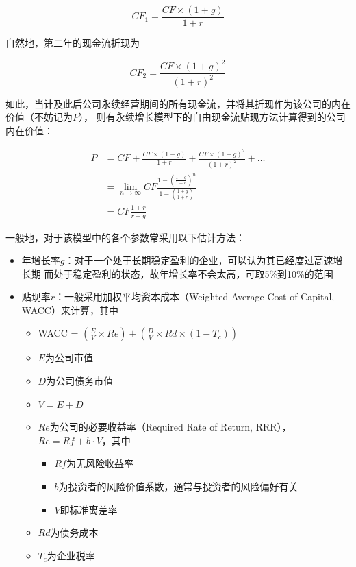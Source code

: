 \documentclass[UTF8]{ctexart}
\numberwithin{figure}{section}
\numberwithin{table}{section}
\numberwithin{equation}{section}
\begin{document}
        \begin{equation}
            CF_1 = \frac{CF \times (1+g)}{1+r}
        \end{equation}

        自然地，第二年的现金流折现为

        \begin{equation}
            CF_2 = \frac{CF \times (1+g)^2}{(1+r)^2}
        \end{equation}

        如此，当计及此后公司永续经营期间的所有现金流，并将其折现作为该公司的内在价值（不妨记为$P$），
    则有永续增长模型下的自由现金流贴现方法计算得到的公司内在价值：


        \begin{equation}
            \begin{aligned}
                P &= CF + \frac{CF \times (1+g)}{1+r} + \frac{CF \times (1+g)^2}{(1+r)^2} + \ldots \\
                    &= \lim_{n\rightarrow \infty} CF \frac{1 - \left(\frac{1+g}{1+r}\right)^n}{1-\left(\frac{1+g}{1+r}\right)} \\
                    &= CF \frac{1+r}{r-g}
            \end{aligned}
        \end{equation}

        一般地，对于该模型中的各个参数常采用以下估计方法：

        \begin{itemize}
            \item 年增长率$g$：对于一个处于长期稳定盈利的企业，可以认为其已经度过高速增长期
            而处于稳定盈利的状态，故年增长率不会太高，可取5\%到10\%的范围
            \item 贴现率$r$：一般采用加权平均资本成本（Weighted Average Cost of Capital, WACC）来计算，其中
            \begin{itemize}
                \item WACC = $\left(\frac{E}{V}\times Re\right) + \left(\frac{D}{V}\times Rd \times (1-T_c)\right)$
                \item $E$为公司市值
                \item $D$为公司债务市值
                \item $V = E+D$
                \item $Re$为公司的必要收益率（Required Rate of Return, RRR），$Re = Rf + b \cdot V$，其中
                \begin{itemize}
                    \item $Rf$为无风险收益率
                    \item $b$为投资者的风险价值系数，通常与投资者的风险偏好有关
                    \item $V$即标准离差率
                \end{itemize}
                \item $Rd$为债务成本
                \item $T_c$为企业税率
            \end{itemize}
        \end{itemize}
\end{document}
